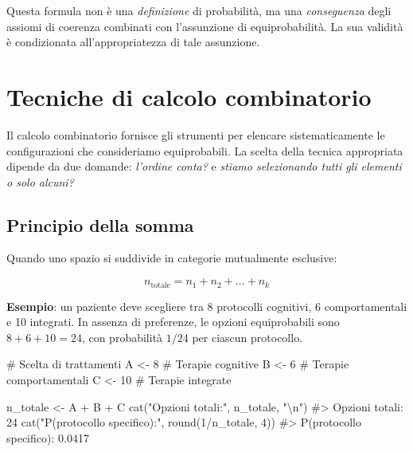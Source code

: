 \documentclass[
  letterpaper,
  DIV=11,
  numbers=noendperiod,
  oneside]{scrreprt}
\newenvironment{Shaded}{\begin{snugshade}}{\end{snugshade}}
\newcommand{\CommentTok}[1]{\textcolor[rgb]{0.37,0.37,0.37}{#1}}
\newcommand{\DecValTok}[1]{\textcolor[rgb]{0.68,0.00,0.00}{#1}}
\newcommand{\FunctionTok}[1]{\textcolor[rgb]{0.28,0.35,0.67}{#1}}
\newcommand{\NormalTok}[1]{\textcolor[rgb]{0.00,0.23,0.31}{#1}}
\newcommand{\OtherTok}[1]{\textcolor[rgb]{0.00,0.23,0.31}{#1}}
\newcommand{\SpecialCharTok}[1]{\textcolor[rgb]{0.37,0.37,0.37}{#1}}
\newcommand{\StringTok}[1]{\textcolor[rgb]{0.13,0.47,0.30}{#1}}
\theoremstyle{definition}
\theoremstyle{plain}
\theoremstyle{definition}
\theoremstyle{remark}
\begin{document}
Questa formula non è una \emph{definizione} di probabilità, ma una
\emph{conseguenza} degli assiomi di coerenza combinati con l'assunzione
di equiprobabilità. La sua validità è condizionata all'appropriatezza di
tale assunzione.

\section{Tecniche di calcolo
combinatorio}\label{tecniche-di-calcolo-combinatorio}

Il calcolo combinatorio fornisce gli strumenti per elencare
sistematicamente le configurazioni che consideriamo equiprobabili. La
scelta della tecnica appropriata dipende da due domande: \emph{l'ordine
conta?} e \emph{stiamo selezionando tutti gli elementi o solo alcuni?}

\subsection{Principio della somma}\label{principio-della-somma}

Quando uno spazio si suddivide in categorie mutualmente esclusive:

\[
n_{\text{totale}} = n_1 + n_2 + \dots + n_k
\]

\textbf{Esempio}: un paziente deve scegliere tra 8 protocolli cognitivi,
6 comportamentali e 10 integrati. In assenza di preferenze, le opzioni
equiprobabili sono \(8 + 6 + 10 = 24\), con probabilità \(1/24\) per
ciascun protocollo.

\begin{Shaded}
\begin{Highlighting}[]
\CommentTok{\# Scelta di trattamenti}
\NormalTok{A }\OtherTok{\textless{}{-}} \DecValTok{8}   \CommentTok{\# Terapie cognitive}
\NormalTok{B }\OtherTok{\textless{}{-}} \DecValTok{6}   \CommentTok{\# Terapie comportamentali}
\NormalTok{C }\OtherTok{\textless{}{-}} \DecValTok{10}  \CommentTok{\# Terapie integrate}

\NormalTok{n\_totale }\OtherTok{\textless{}{-}}\NormalTok{ A }\SpecialCharTok{+}\NormalTok{ B }\SpecialCharTok{+}\NormalTok{ C}
\FunctionTok{cat}\NormalTok{(}\StringTok{"Opzioni totali:"}\NormalTok{, n\_totale, }\StringTok{"}\SpecialCharTok{\textbackslash{}n}\StringTok{"}\NormalTok{)}
\CommentTok{\#\textgreater{} Opzioni totali: 24}
\FunctionTok{cat}\NormalTok{(}\StringTok{"P(protocollo specifico):"}\NormalTok{, }\FunctionTok{round}\NormalTok{(}\DecValTok{1}\SpecialCharTok{/}\NormalTok{n\_totale, }\DecValTok{4}\NormalTok{))}
\CommentTok{\#\textgreater{} P(protocollo specifico): 0.0417}
\end{Highlighting}
\end{Shaded}
\end{document}
